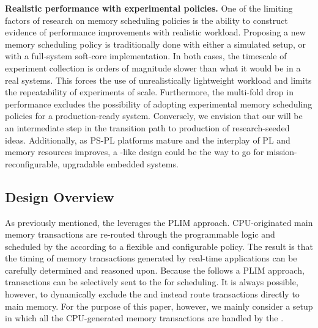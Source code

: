 \par{\bf Realistic performance with experimental policies.} One of the
limiting factors of research on memory scheduling policies is the
ability to construct evidence of performance improvements with
realistic workload. Proposing a new memory scheduling policy is
traditionally done with either a simulated setup, or with a
full-system soft-core implementation. In both cases, the timescale of
experiment collection is orders of magnitude slower than what it would
be in a real systems. This forces the use of unrealistically
lightweight workload and limits the repeatability of experiments of
scale. Furthermore, the multi-fold drop in performance excludes the
possibility of adopting experimental memory scheduling policies for a
production-ready system. Conversely, we envision that our \schim will
be an intermediate step in the transition path to production of
research-seeded ideas. Additionally, as PS-PL platforms mature and the
interplay of PL and memory resources improves, a \schim-like design
could be the way to go for mission-reconfigurable, upgradable embedded
systems.

\subsection{Design Overview}
As previously mentioned, the \schim leverages the PLIM
approach. CPU-originated main memory transactions are re-routed
through the programmable logic and scheduled by the \schim according
to a flexible and configurable policy. The result is that the timing
of memory transactions generated by real-time applications can be
carefully determined and reasoned upon. Because the \schim follows a
PLIM approach, transactions can be selectively sent to the \schim for
scheduling. It is always possible, however, to dynamically exclude the
\schim and instead route transactions directly to main memory. For the
purpose of this paper, however, we mainly consider a setup in which
all the CPU-generated memory transactions are handled by the \schim.


